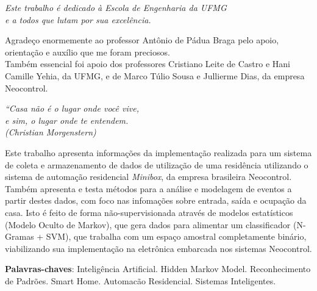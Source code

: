 \documentclass[
	12pt,				%
	openright,			%
	twoside,			%
	a4paper,			%
	english,			%
	spanish,			%
	brazil,				%
	]{abntex2}\usepackage[]{graphicx}\usepackage[]{color}
\begin{document}
\frenchspacing 


\imprimircapa

\imprimirfolhaderosto

\begin{dedicatoria}
   \vspace*{\fill}
   \centering
   \noindent
   \textit{ Este trabalho é dedicado à Escola de Engenharia da UFMG \\
   	 e a todos que lutam por sua excelência. } \vspace*{\fill}
\end{dedicatoria}

\begin{agradecimentos}
Agradeço enormemente ao professor Antônio de Pádua Braga pelo apoio, orientação e auxílio que me foram preciosos.\\
Também essencial foi apoio dos professores Cristiano Leite de Castro e Hani Camille Yehia, da UFMG, e de Marco Túlio Sousa e Jullierme Dias, da empresa Neocontrol.
\end{agradecimentos}

\begin{epigrafe}
    \vspace*{\fill}
	\begin{flushright}
		\textit{``Casa não é o lugar onde você vive,\\
					e sim, o lugar onde te entendem.\\
		(Christian Morgenstern)}
	\end{flushright}
\end{epigrafe}

\setlength{\absparsep}{18pt} %
\begin{resumo}

 Este trabalho apresenta informações da implementação realizada para um sistema de coleta e armazenamento de dados de utilização de uma residência utilizando o sistema de automação residencial \textit{Minibox}, da empresa brasileira Neocontrol. Também apresenta e testa métodos para a análise e modelagem de eventos a partir destes dados, com foco nas infomações sobre entrada, saída e ocupação da casa. Isto é feito de forma não-supervisionada através de modelos estatísticos (Modelo Oculto de Markov), que gera dados para alimentar um classificador (N-Gramas + SVM), que trabalha com um espaço amostral completamente binário, viabilizando sua implementação na eletrônica embarcada nos sistemas Neocontrol.

 \textbf{Palavras-chaves}: Inteligência Artificial. Hidden Markov Model. Reconhecimento de Padrões. Smart Home. Automacão Residencial. Sistemas Inteligentes.
\end{resumo}
\end{document}
